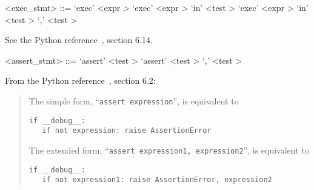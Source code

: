 \label{execzzzstmtb}

\begin{grammar}
<exec_stmt> ::= `exec' <expr \myref[exprb]>
	\alt `exec' <expr \myref[exprb]> `in' <test \myref[testb]>
	\alt `exec' <expr \myref[exprb]> `in' <test \myref[testb]> `,' <test \myref[testb]>
\end{grammar}


See the Python reference~\cite{pythonlang}, section 6.14.

\label{assertzzzstmtb}

\begin{grammar}
<assert_stmt> ::= `assert' <test \myref[testb]>
	\alt `assert' <test \myref[testb]> `,' <test \myref[testb]>
\end{grammar}


From the Python reference~\cite{pythonlang}, section 6.2:
\begin{quote}
The simple form, ``\verb|assert expression|'', is equivalent to 
\begin{verbatim}
if __debug__:
   if not expression: raise AssertionError
\end{verbatim}

 The extended form, ``\verb|assert expression1, expression2|'', is equivalent to 
\begin{verbatim}
if __debug__:
   if not expression1: raise AssertionError, expression2
\end{verbatim}
\end{quote}

